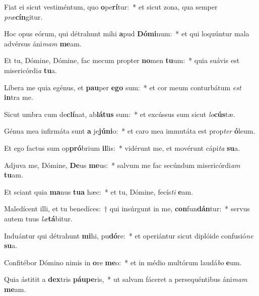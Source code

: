 \item Fiat ei sicut vestiméntum, quo \textbf{o}pe\textbf{rí}tur:~* et sicut zona, qua semper \textit{præ}\textbf{cín}gitur.
\item Hoc opus eórum, qui détrahunt mihi \textbf{a}pud \textbf{Dó}\textbf{mi}num:~* et qui loquúntur mala advérsus áni\textit{mam} \textbf{me}am.
\item Et tu, Dómine, Dómine, fac mecum propter \textbf{no}men \textbf{tu}um:~* quia suávis est misericórdi\textit{a} \textbf{tu}a.
\item Líbera me quia egénus, et \textbf{pau}per \textbf{e}\textbf{go} sum:~* et cor meum conturbátum \textit{est} \textbf{in}tra me.
\item Sicut umbra cum de\textbf{clí}nat, ab\textbf{lá}\textbf{tus} sum:~* et excússus sum sicut \textit{lo}\textbf{cús}tæ.
\item Génua mea infirmáta sunt \textbf{a} je\textbf{jú}\textbf{ni}o:~* et caro mea immutáta est prop\textit{ter} \textbf{ó}leum.
\item Et ego factus sum op\textbf{pró}brium \textbf{il}lis:~* vidérunt me, et movérunt cápi\textit{ta} \textbf{su}a.
\item Adjuva me, Dómine, \textbf{De}us \textbf{me}us:~* salvum me fac secúndum misericórdi\textit{am} \textbf{tu}am.
\item Et sciant quia \textbf{ma}nus \textbf{tu}\textbf{a} hæc:~* et tu, Dómine, fecís\textit{ti} \textbf{e}am.
\item Maledícent illi, et tu benedíces:~† qui insúrgunt in me, \textbf{con}fun\textbf{dán}tur:~* servus autem tuus \textit{læ}\textbf{tá}bitur.
\item Induántur qui détrahunt \textbf{mi}hi, pu\textbf{dó}re:~* et operiántur sicut diplóide confusió\textit{ne} \textbf{su}a.
\item Confitébor Dómino nimis in \textbf{o}re \textbf{me}o:~* et in médio multórum laudá\textit{bo} \textbf{e}um.
\item Quia ástitit a \textbf{dex}tris \textbf{páu}\textbf{pe}ris,~* ut salvam fáceret a persequéntibus áni\textit{mam} \textbf{me}am.
